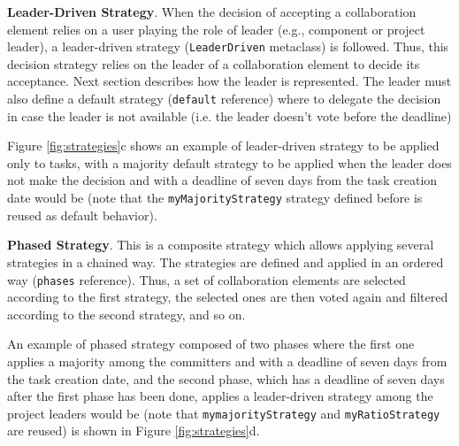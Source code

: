 \vspace{0.15em}
\noindent \textbf{Leader-Driven Strategy}. When the decision of accepting a collaboration element relies on a user playing the role of leader (e.g., component or project leader), a leader-driven strategy (\texttt{LeaderDriven} metaclass) is followed. Thus, this decision strategy relies on the leader of a collaboration element to decide its acceptance. Next section describes how the leader is represented. The leader must also define a default strategy (\texttt{default} reference) where to delegate the decision in case the leader is not available (i.e. the leader doesn't vote before the deadline)
  
Figure \ref{fig:strategies}c shows an example of leader-driven strategy to be applied only to tasks, with a majority default strategy to be applied when the leader does not make the decision and with a deadline of seven days from the task creation date would be (note that the \texttt{myMajorityStrategy} strategy defined before is reused as default behavior).


\vspace{0.15em}
\noindent  \textbf{Phased Strategy}. This is a composite strategy which allows applying several strategies in a chained way. The strategies are defined and applied in an ordered way (\texttt{phases} reference). Thus, a set of collaboration elements are selected according to the first strategy, the selected ones are then voted again and filtered according to the second strategy, and so on. 

    An example of phased strategy composed of two phases where the first one applies a majority among the committers and with a deadline of seven days from the task creation date, and the second phase, which has a deadline of seven days after the first phase has been done, applies a leader-driven strategy among the project leaders would be (note that \texttt{mymajorityStrategy} and \texttt{myRatioStrategy} are reused) is shown in Figure \ref{fig:strategies}d.




